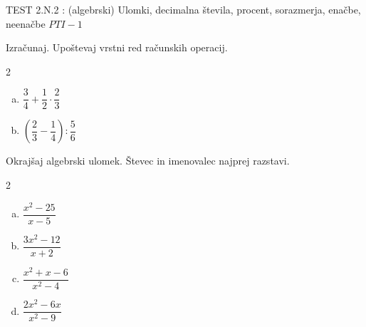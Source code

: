 \documentclass[a4paper,12pt]{letter}
\renewcommand{\headrulewidth}{3pt}
\renewcommand{\headrulewidth}{0.3pt}
\begin{document}
\pagestyle{fancy}
\renewcommand\headrulewidth{0pt}
\lhead{}\chead{}\rhead{}
\rfoot{\vspace*{-2\baselineskip}}
\renewcommand{\vec}{\overrightarrow}
\everymath{\displaystyle}

\begin{minipage}{20cm}
\begin{bclogo}[couleur=brown!40,
  arrondi=0,ombre=true, couleurOmbre=gray!50,
logo =\bcplume,
  noborder=true]
{\textrm{{\Large{TEST 2.N.2} \Huge{}:
\large{(algebrski) Ulomki, decimalna števila, procent, sorazmerja, enačbe, neenačbe} \hfill $PTI-1$}}}
\end{bclogo}
\end{minipage}
\begin{minipage}{20cm}
\end{minipage}




\begin{naloga}
Izra\v{c}unaj. Upo\v{s}tevaj vrstni red ra\v{c}unskih operacij.

\begin{multicols}{2}
\begin{enumerate}[a.)]
\item $\dfrac{3}{4}+\dfrac{1}{2}\cdot\dfrac{2}{3}$
\item $\left(\dfrac{2}{3}-\dfrac{1}{4}\right):\dfrac{5}{6}$
\end{enumerate}
\end{multicols}
\end{naloga}

\begin{naloga}
Okraj\v{s}aj algebrski ulomek. \v{S}tevec in imenovalec najprej razstavi.

\begin{multicols}{2}
\begin{enumerate}[a.)]
\item $\dfrac{x^2-25}{x-5}$
\item $\dfrac{3x^2-12}{x+2}$
\item $\dfrac{x^2+x-6}{x^2-4}$
\item $\dfrac{2x^2-6x}{x^2-9}$
\end{enumerate}
\end{multicols}
\end{naloga}
\end{document}
